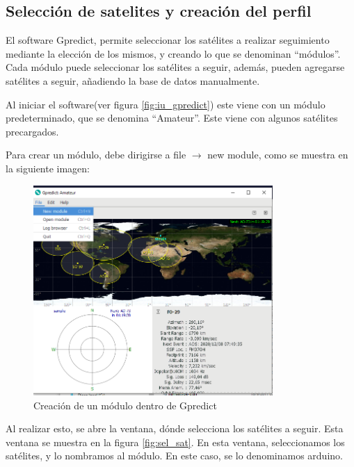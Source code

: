 \subsection{Selección de satelites y creación del perfil} 

El software Gpredict, permite seleccionar los satélites a realizar seguimiento mediante la elección de los mismos, y creando lo que se denominan ``módulos''. Cada módulo puede seleccionar los satélites a seguir, además, pueden agregarse satélites a seguir, añadiendo la base de datos manualmente.

Al iniciar el software(ver figura \ref{fig:iu_gpredict}) este viene con un módulo predeterminado, que se denomina ``Amateur''. Este viene con algunos satélites precargados. 

Para crear un módulo, debe dirigirse a file $\rightarrow$ new module, como se muestra en la siguiente imagen:%
\begin{figure}[ht]
	\centering
	\includegraphics[width=\textwidth,height=8cm]{create_module}
	\caption{Creación de un módulo dentro de Gpredict} 
	\label{fig:create_modul_gpred}	
\end{figure}

Al realizar esto, se abre la ventana, dónde selecciona los satélites a seguir. Esta ventana se muestra en la figura \ref{fig:sel_sat}. En esta ventana, seleccionamos los satélites, y lo nombramos al módulo. En este caso, se lo denominamos arduino. 

